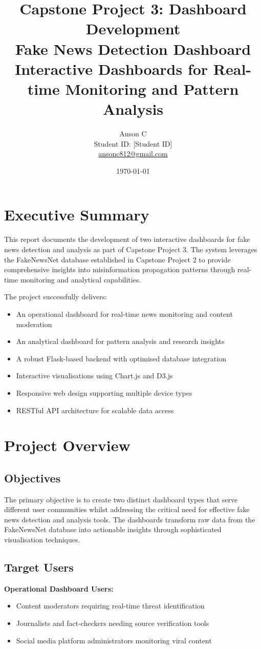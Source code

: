 \documentclass[12pt,a4paper]{article}
\title{
    \textbf{Capstone Project 3: Dashboard Development} \\
    \large{Fake News Detection Dashboard} \\
    \vspace{0.5cm}
    \normalsize{Interactive Dashboards for Real-time Monitoring and Pattern Analysis}
}
\author{Anson C \\ Student ID: [Student ID] \\ \href{mailto:ansonc812@gmail.com}{ansonc812@gmail.com}}
\date{\today}
\begin{document}
\maketitle
\newpage

\tableofcontents
\newpage

\section{Executive Summary}

This report documents the development of two interactive dashboards for fake news detection and analysis as part of Capstone Project 3. The system leverages the FakeNewsNet database established in Capstone Project 2 to provide comprehensive insights into misinformation propagation patterns through real-time monitoring and analytical capabilities.

The project successfully delivers:
\begin{itemize}
    \item An operational dashboard for real-time news monitoring and content moderation
    \item An analytical dashboard for pattern analysis and research insights  
    \item A robust Flask-based backend with optimised database integration
    \item Interactive visualisations using Chart.js and D3.js
    \item Responsive web design supporting multiple device types
    \item RESTful API architecture for scalable data access
\end{itemize}

\section{Project Overview}

\subsection{Objectives}
The primary objective is to create two distinct dashboard types that serve different user communities whilst addressing the critical need for effective fake news detection and analysis tools. The dashboards transform raw data from the FakeNewsNet database into actionable insights through sophisticated visualisation techniques.

\subsection{Target Users}
\textbf{Operational Dashboard Users:}
\begin{itemize}
    \item Content moderators requiring real-time threat identification
    \item Journalists and fact-checkers needing source verification tools
    \item Social media platform administrators monitoring viral content
\end{itemize}
\end{document}
